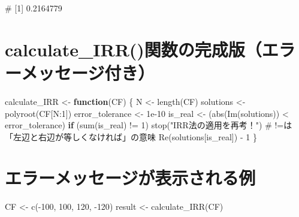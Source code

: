 \documentclass[
  letterpaper,
  DIV=11,
  numbers=noendperiod]{scrreprt}
\newenvironment{Shaded}{\begin{snugshade}}{\end{snugshade}}
\newcommand{\CommentTok}[1]{\textcolor[rgb]{0.37,0.37,0.37}{#1}}
\newcommand{\ControlFlowTok}[1]{\textcolor[rgb]{0.00,0.23,0.31}{\textbf{#1}}}
\newcommand{\DecValTok}[1]{\textcolor[rgb]{0.68,0.00,0.00}{#1}}
\newcommand{\FloatTok}[1]{\textcolor[rgb]{0.68,0.00,0.00}{#1}}
\newcommand{\FunctionTok}[1]{\textcolor[rgb]{0.28,0.35,0.67}{#1}}
\newcommand{\NormalTok}[1]{\textcolor[rgb]{0.00,0.23,0.31}{#1}}
\newcommand{\OtherTok}[1]{\textcolor[rgb]{0.00,0.23,0.31}{#1}}
\newcommand{\SpecialCharTok}[1]{\textcolor[rgb]{0.37,0.37,0.37}{#1}}
\newcommand{\StringTok}[1]{\textcolor[rgb]{0.13,0.47,0.30}{#1}}
\begin{document}
\begin{Shaded}
\begin{Highlighting}[]
\CommentTok{\# [1] 0.2164779}
\end{Highlighting}
\end{Shaded}

\section{calculate\_IRR()関数の完成版（エラーメッセージ付き）}\label{calculate_irrux95a2ux6570ux306eux5b8cux6210ux7248ux30a8ux30e9ux30fcux30e1ux30c3ux30bbux30fcux30b8ux4ed8ux304d}

\begin{Shaded}
\begin{Highlighting}[]
\NormalTok{calculate\_IRR }\OtherTok{\textless{}{-}} \ControlFlowTok{function}\NormalTok{(CF) \{}
\NormalTok{  N }\OtherTok{\textless{}{-}} \FunctionTok{length}\NormalTok{(CF) }
\NormalTok{  solutions }\OtherTok{\textless{}{-}} \FunctionTok{polyroot}\NormalTok{(CF[N}\SpecialCharTok{:}\DecValTok{1}\NormalTok{]) }
\NormalTok{  error\_tolerance }\OtherTok{\textless{}{-}} \FloatTok{1e{-}10}
\NormalTok{  is\_real }\OtherTok{\textless{}{-}}\NormalTok{ (}\FunctionTok{abs}\NormalTok{(}\FunctionTok{Im}\NormalTok{(solutions)) }\SpecialCharTok{\textless{}}\NormalTok{ error\_tolerance)}
  \ControlFlowTok{if}\NormalTok{ (}\FunctionTok{sum}\NormalTok{(is\_real) }\SpecialCharTok{!=} \DecValTok{1}\NormalTok{) }\FunctionTok{stop}\NormalTok{(}\StringTok{"IRR法の適用を再考！"}\NormalTok{) }\CommentTok{\# !=は「左辺と右辺が等しくなければ」の意味}
  \FunctionTok{Re}\NormalTok{(solutions[is\_real]) }\SpecialCharTok{{-}} \DecValTok{1}
\NormalTok{\}}
\end{Highlighting}
\end{Shaded}

\section{エラーメッセージが表示される例}\label{ux30a8ux30e9ux30fcux30e1ux30c3ux30bbux30fcux30b8ux304cux8868ux793aux3055ux308cux308bux4f8b}

\begin{Shaded}
\begin{Highlighting}[]
\NormalTok{CF }\OtherTok{\textless{}{-}} \FunctionTok{c}\NormalTok{(}\SpecialCharTok{{-}}\DecValTok{100}\NormalTok{, }\DecValTok{100}\NormalTok{, }\DecValTok{120}\NormalTok{, }\SpecialCharTok{{-}}\DecValTok{120}\NormalTok{)}
\NormalTok{result }\OtherTok{\textless{}{-}} \FunctionTok{calculate\_IRR}\NormalTok{(CF)}
\end{Highlighting}
\end{Shaded}
\end{document}

